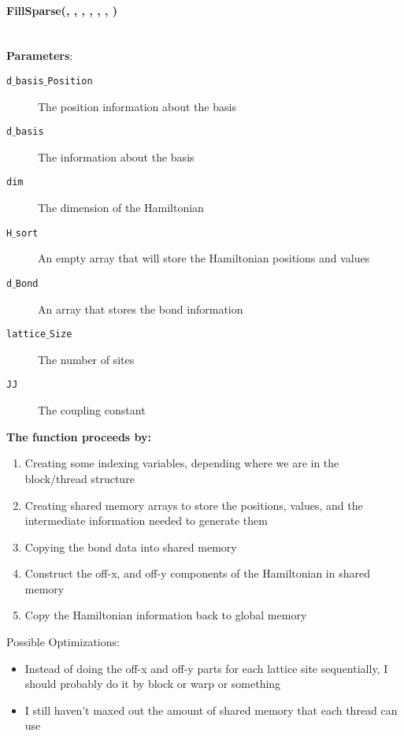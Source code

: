 \documentclass{article}
\begin{document}
\paragraph{\cudaglobal \void FillSparse(\ptrint , \ptrint , \int, \hamstruct, \int , \int , \const \double ) \\ \\ }
\noindent\textbf{Parameters}:
\begin{description}
\item[\ptrint \texttt{d$\_$basis$\_$Position}] The position information about the basis
\item[\ptrint \texttt{d$\_$basis}] The information about the basis
\item[\int \texttt{dim}] The dimension of the Hamiltonian
\item[\cuDoubleComplex \texttt{H$\_$sort}] An empty array that will store the Hamiltonian positions and values
\item[\int \texttt{d$\_$Bond}] An array that stores the bond information
\item[\int \texttt{lattice$\_$Size}] The number of sites
\item[\const \double \texttt{JJ}] The coupling constant
\end{description}

\noindent\textbf{The function proceeds by:}
\begin{enumerate}
\item{Creating some indexing variables, depending where we are in the block/thread structure}
\item{Creating shared memory arrays to store the positions, values, and the intermediate information needed to generate them}
\item{Copying the bond data into shared memory}
\item{Construct the off-x, and off-y components of the Hamiltonian in shared memory}
\item{Copy the Hamiltonian information back to global memory}
\end{enumerate}

Possible Optimizations:
\begin{itemize}
\item{Instead of doing the off-x and off-y parts for each lattice site sequentially, I should probably do it by block or warp or something}
\item{I still haven't maxed out the amount of shared memory that each thread can use}
\end{itemize}
\end{document}
